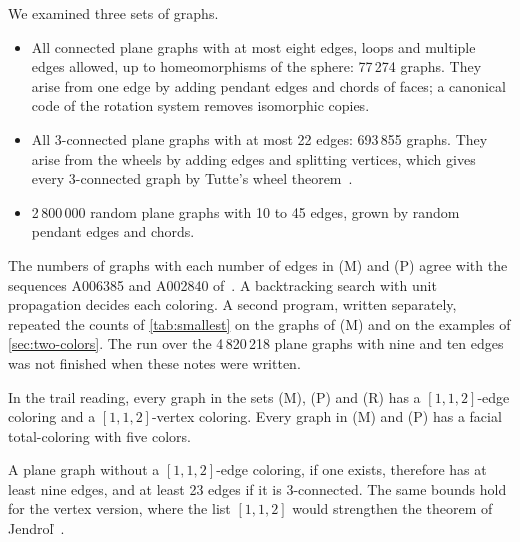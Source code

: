 \documentclass[11pt,a4paper]{article}
\begin{document}
We examined three sets of graphs.
\begin{itemize}
  \item[(M)] All connected plane graphs with at most eight edges, loops and multiple edges allowed, up to homeomorphisms of the sphere: 77\,274 graphs.
        They arise from one edge by adding pendant edges and chords of faces; a canonical code of the rotation system removes isomorphic copies.
  \item[(P)] All 3-connected plane graphs with at most 22 edges: 693\,855 graphs.
        They arise from the wheels by adding edges and splitting vertices, which gives every 3-connected graph by Tutte's wheel theorem~\cite[Notes of Chapter~3]{Diestel2025}.
  \item[(R)] 2\,800\,000 random plane graphs with 10 to 45 edges, grown by random pendant edges and chords.
\end{itemize}
The numbers of graphs with each number of edges in (M) and (P) agree with the sequences A006385 and A002840 of~\cite{OEIS}.
A backtracking search with unit propagation decides each coloring.
A second program, written separately, repeated the counts of \cref{tab:smallest} on the graphs of (M) and on the examples of \cref{sec:two-colors}.
The run over the 4\,820\,218 plane graphs with nine and ten edges was not finished when these notes were written.

\begin{proposition}
\label{prop:search}
In the trail reading, every graph in the sets (M), (P) and (R) has a $[1,1,2]$-edge coloring and a $[1,1,2]$-vertex coloring.
Every graph in (M) and (P) has a facial total-coloring with five colors.
\end{proposition}

A plane graph without a $[1,1,2]$-edge coloring, if one exists, therefore has at least nine edges, and at least 23 edges if it is 3-connected.
The same bounds hold for the vertex version, where the list $[1,1,2]$ would strengthen the theorem of Jendroľ~\cite{Jendrol2026ThreeColoring}.
\end{document}

